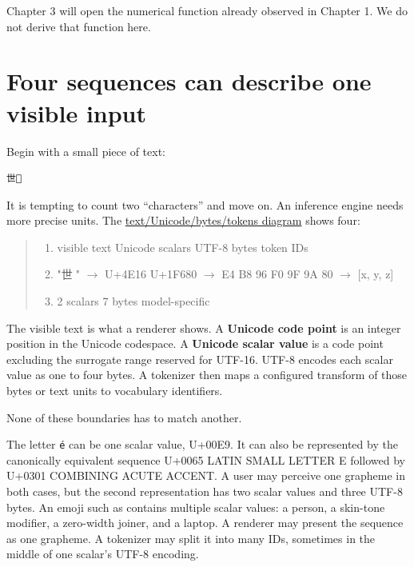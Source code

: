 Chapter 3 will open the numerical function already observed in Chapter 1.
We do not derive that function here.

\section{Four sequences can describe one visible
input}\label{four-sequences-can-describe-one-visible-input}

Begin with a small piece of text:

\begin{verbatim}
世🚀
\end{verbatim}

It is tempting to count two ``characters'' and move on. An inference
engine needs more precise units. The
\href{https://github.com/hermonai/inside-the-llm-engine/blob/astra-visual-rewrite/diagrams/tokenizer/text-unicode-bytes-tokens.txt}{text/Unicode/bytes/tokens
diagram} shows four:

\begin{quote}
\begin{enumerate}
\item visible text       Unicode scalars       UTF-8 bytes           token IDs
\item "世🚀"          \(\longrightarrow\)   U+4E16 U+1F680    \(\longrightarrow\)   E4 B8 96 F0 9F 9A 80  \(\longrightarrow\)  [x, y, z]
\item 2 scalars                7 bytes            model-specific
\end{enumerate}
\end{quote}

The visible text is what a renderer shows. A \textbf{Unicode code point}
is an integer position in the Unicode codespace. A \textbf{Unicode
scalar value} is a code point excluding the surrogate range reserved for
UTF-16. UTF-8 encodes each scalar value as one to four bytes. A
tokenizer then maps a configured transform of those bytes or text units
to vocabulary identifiers.

None of these boundaries has to match another.

The letter \texttt{é} can be one scalar value, U+00E9. It can also be
represented by the canonically equivalent sequence U+0065 LATIN SMALL
LETTER E followed by U+0301 COMBINING ACUTE ACCENT. A user may perceive
one grapheme in both cases, but the second representation has two scalar
values and three UTF-8 bytes. An emoji such as
 contains multiple scalar values: a
person, a skin-tone modifier, a zero-width joiner, and a laptop. A
renderer may present the sequence as one grapheme. A tokenizer may split
it into many IDs, sometimes in the middle of one scalar's UTF-8
encoding.

